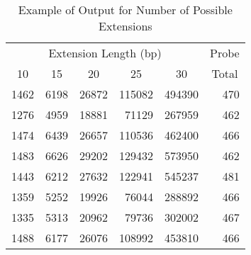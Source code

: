 \begin{table}[bth]
\caption{Example of Output for Number of Possible Extensions}
\label{'table2'}
\begin{center}
\begin{tabular}{||rrrrr|r||}  \hline
\multicolumn{5}{||c|}{Extension Length (bp)} & \multicolumn{1}{c||}{Probe} \\ 
\multicolumn{1}{||c}{10} & \multicolumn{1}{c}{15} &
\multicolumn{1}{c}{20} & \multicolumn{1}{c}{25} & \multicolumn{1}{c}{30} &
\multicolumn{1}{|c||}{Total} \\ \hline
  1462 & 6198 & 26872 & 115082 & 494390 & 470 \\
  1276 & 4959 & 18881 &  71129 & 267959 & 462 \\
  1474 & 6439 & 26657 & 110536 & 462400 & 466 \\
  1483 & 6626 & 29202 & 129432 & 573950 & 462 \\
  1443 & 6212 & 27632 & 122941 & 545237 & 481 \\
  1359 & 5252 & 19926 &  76044 & 288892 & 466 \\
  1335 & 5313 & 20962 &  79736 & 302002 & 467 \\
  1488 & 6177 & 26076 & 108992 & 453810 & 466 \\ \hline
\end{tabular}
\end{center}
\end{table}
